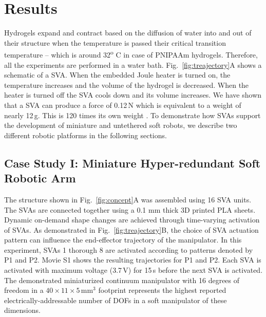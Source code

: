\section{Results}
Hydrogels expand and contract based on the diffusion of water into and out of their structure when the temperature is passed their critical transition temperature -- which is around 32\textsuperscript{o} C in case of PNIPAAm hydrogels. Therefore, all the experiments are performed in a water bath. Fig.~\ref{fig:treajectory}A shows a schematic of a SVA. When the embedded Joule heater is turned on, the temperature increases and the volume of the hydrogel is decreased. When the heater is turned off the SVA cools down and its volume increases. We have shown that a SVA can produce a force of 0.12\,N which is equivalent to a weight of nearly 12\,g. This is 120 times its own weight \cite{khodambashi2021}. To demonstrate how SVAs support the development of miniature and untethered soft robots, we describe two different robotic platforms in the following sections. 
\subsection{Case Study I: Miniature Hyper-redundant Soft Robotic Arm}
The structure shown in Fig.~\ref{fig:concept}A was assembled using 16 SVA units. The SVAs are connected together using a 0.1 mm thick 3D printed PLA sheets. Dynamic on-demand shape changes are achieved through time-varying activation of SVAs.
As demonstrated in Fig.~\ref{fig:treajectory}B, the choice of SVA actuation pattern can influence the end-effector trajectory of the manipulator. In this experiment, SVAs 1 thorough 8 are activated according to patterns denoted by P1 and P2. Movie S1 shows the resulting trajectories for P1 and P2.
Each SVA is activated with maximum voltage (3.7\,V) for 15\,s before the next SVA is activated.
The demonstrated miniaturized continuum manipulator with 16 degrees of freedom in a $40\times11\times5$\,mm$^3$ footprint represents the highest reported electrically-addressable number of DOFs in a soft manipulator of these dimensions. 
